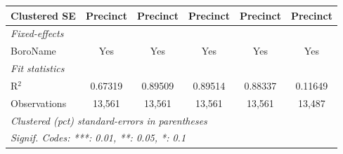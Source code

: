 \begin{tabular}{lccccc}
   Clustered SE & Precinct                              & Precinct                              & Precinct                               & Precinct                                 & Precinct\\  
   \midrule
   \emph{Fixed-effects}\\
   BoroName     & Yes                                   & Yes                                   & Yes                                    & Yes                                      & Yes\\  
   \midrule
   \emph{Fit statistics}\\
   R$^2$        & 0.67319                               & 0.89509                               & 0.89514                                & 0.88337                                  & 0.11649\\  
   Observations & 13,561                                & 13,561                                & 13,561                                 & 13,561                                   & 13,487\\  
   \midrule \midrule
   \multicolumn{6}{l}{\emph{Clustered (pct) standard-errors in parentheses}}\\
   \multicolumn{6}{l}{\emph{Signif. Codes: ***: 0.01, **: 0.05, *: 0.1}}\\
\end{tabular}
\par\endgroup
